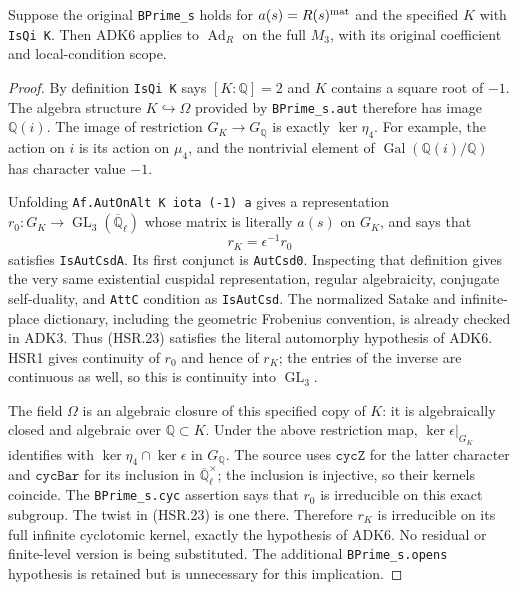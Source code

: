 \begin{proposition}
\label{claim:HSR8}
Suppose the original \texttt{BPrime\_s} holds for
$a(s)=R(s)^{\rm mat}$ and the specified $K$ with
\texttt{IsQi K}.  Then ADK6 applies to
$\operatorname{Ad}_R$ on the full $M_3$, with its original
coefficient and local-condition scope.
\end{proposition}
\begin{proof}
By definition \texttt{IsQi K} says $[K:\mathbb Q]=2$ and
$K$ contains a square root of $-1$.  The algebra structure
$K\hookrightarrow\Omega$ provided by
\texttt{BPrime\_s.aut} therefore has image $\mathbb Q(i)$.
The image of restriction $G_K\to G_{\mathbb Q}$ is exactly
$\ker\eta_4$.  For example, the action on $i$ is its action on
$\mu_4$, and the nontrivial element of
$\operatorname{Gal}(\mathbb Q(i)/\mathbb Q)$ has character
value $-1$.

Unfolding \texttt{Af.AutOnAlt K iota (-1) a} gives a
representation $r_0:G_K\to\operatorname{GL}_3
(\overline{\mathbb Q}_\ell)$ whose matrix is literally
$a(s)$ on $G_K$, and says that
\[
                         r_K=\epsilon^{-1}r_0
 \tag{HSR.23}
\]
satisfies \texttt{IsAutCsdA}.  Its first conjunct is
\texttt{AutCsd0}.  Inspecting that definition gives the very same
existential cuspidal representation, regular algebraicity,
conjugate self-duality, and \texttt{AttC} condition as
\texttt{IsAutCsd}.  The normalized Satake and infinite-place
dictionary, including the geometric Frobenius convention, is
already checked in ADK3.  Thus (HSR.23) satisfies the literal
automorphy hypothesis of ADK6.  HSR1 gives continuity of $r_0$
and hence of $r_K$; the entries of the inverse are continuous as
well, so this is continuity into $\operatorname{GL}_3$.

The field $\Omega$ is an algebraic closure of this specified
copy of $K$: it is algebraically closed and algebraic over
$\mathbb Q\subset K$.  Under the above restriction map,
$\ker\epsilon|_{G_K}$ identifies with
$\ker\eta_4\cap\ker\epsilon$ in $G_{\mathbb Q}$.
The source uses $\texttt{cycZ}$ for the latter character and
$\texttt{cycBar}$ for its inclusion in
$\overline{\mathbb Q}_\ell^\times$; the inclusion is injective,
so their kernels coincide.  The \texttt{BPrime\_s.cyc}
assertion says that $r_0$ is irreducible on this exact subgroup.
The twist in (HSR.23) is one there.  Therefore $r_K$ is
irreducible on its full infinite cyclotomic kernel, exactly the
hypothesis of ADK6.  No residual or finite-level version is being
substituted.  The additional \texttt{BPrime\_s.opens} hypothesis
is retained but is unnecessary for this implication.


\end{proof}
